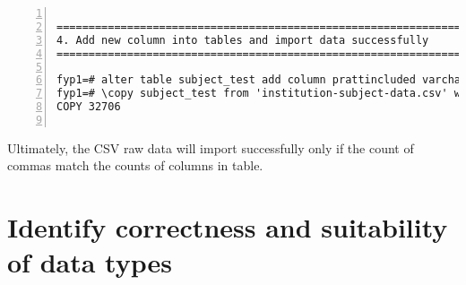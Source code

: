 \lstset{basicstyle=\ttfamily\tiny} 
\begin{lstlisting}[breaklines, frame=single, numbers=left, caption={Identify completeness in datasets.}, label=commandline-02]

========================================================================
4. Add new column into tables and import data successfully
========================================================================

fyp1=# alter table subject_test add column prattincluded varchar(20) null default null;
fyp1=# \copy subject_test from 'institution-subject-data.csv' with header csv;
COPY 32706


\end{lstlisting}

Ultimately, the CSV raw data will import successfully only if the count of commas match the counts of columns in table. 
\pagebreak

\section{Identify correctness and suitability of data types}

